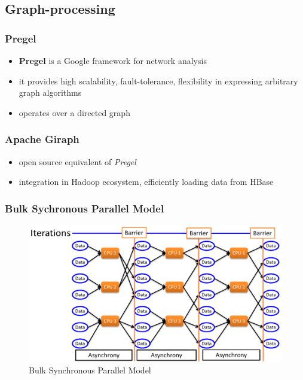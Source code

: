 \documentclass[a4paper]{article}
\begin{document}
\begin{multicols}{3}
\subsection{Graph-processing}
\subsubsection{Pregel}
\begin{itemize}
    \item \textbf{Pregel} is a Google framework for network analysis
    \item it provides high scalability, fault-tolerance, flexibility in expressing arbitrary graph algorithms
    \item operates over a directed graph
\end{itemize}

\subsubsection{Apache Giraph}
\begin{itemize}
    \item open source equivalent of \textit{Pregel}
    \item integration in Hadoop ecosystem, efficiently loading data from HBase
\end{itemize}

\subsubsection{Bulk Sychronous Parallel Model}

\begin{figure}[H]
    \includegraphics[width=\linewidth]{BSPModel.png}
    \caption{Bulk Synchronous Parallel Model}
    \label{fig:bspmodel}
\end{figure}


\end{multicols}
\end{document}
